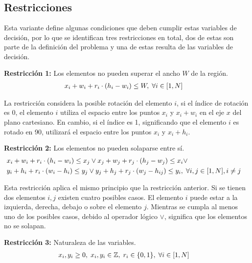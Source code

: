 \documentclass[letter, 10pt]{article}
\begin{document}
\subsection{Restricciones}

Esta variante define algunas condiciones que deben cumplir estas variables de decisi\'on, por lo que se identifican tres restricciones en total, dos de estas son parte de la definici\'on del problema y una de estas resulta de las variables de decisi\'on.

\vspace{0.2cm}
\textbf{Restricci\'on 1:} Los elementos no pueden superar el ancho $W$ de la regi\'on.
\begin{align}
    & x_{i} + w_{i} + r_{i} \cdot (h_{i} - w_{i}) \leq W, \hspace{0.1cm} \forall i \in [1,N] &
\end{align}

La restricci\'on considera la posible rotaci\'on del elemento $i$, si el \'indice de rotaci\'on es 0, el elemento $i$ utiliza el espacio entre los puntos $x_{i}$ y $x_{i} + w_{i}$ en el eje $x$ del plano cartesiano. En cambio, si el \'indice es 1, significando que el elemento $i$ es rotado en 90\textdegree, utilizar\'a el espacio entre los puntos $x_{i}$ y $x_{i} + h_{i}$.

\vspace{0.2cm}
\textbf{Restricci\'on 2:} Los elementos no pueden solaparse entre s\'i.
\begin{align}
    & x_{i} + w_{i} + r_{i} \cdot (h_{i} - w_{i}) \leq x_{j} \vee x_{j} + w_{j} + r_{j} \cdot (h_{j} - w_{j}) \leq x_{i} \vee & \\ \nonumber
    & y_{i} + h_{i} + r_{i} \cdot (w_{i} - h_{i}) \leq y_{j} \vee y_{j} + h_{j} + r_{j} \cdot (w_{j} - h_{ij}) \leq y_{i},\hspace{0.1cm} \forall i,j \in [1,N], i \neq j &
\end{align}

Esta restricci\'on aplica el mismo principio que la restricci\'on anterior. Si se tienen dos elementos $i, j$ existen cuatro posibles casos. El elemento $i$ puede estar a la izquierda, derecha, debajo o sobre el elemento $j$. Mientras se cumpla al menos uno de los posibles casos, debido al operador l\'ogico $\vee$, significa que los elementos no se solapan.

\vspace{0.2cm}
\textbf{Restricci\'on 3:} Naturaleza de las variables.
\begin{align}
    & x_{i}, y_{i} \geq 0, \hspace{0.1cm} x_{i}, y_{i} \in \mathbb{Z}, \hspace{0.1cm} r_{i} \in \{0,1\}, \hspace{0.1cm} \forall i \in [1,N] &
\end{align}
\end{document}
